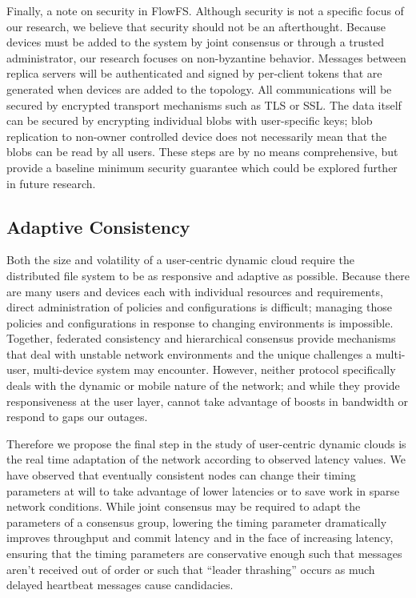 \documentclass{article}
\begin{document}
Finally, a note on security in FlowFS. Although security is not a specific focus of our research, we believe that security should not be an afterthought. Because devices must be added to the system by joint consensus or through a trusted administrator, our research focuses on non-byzantine behavior. Messages between replica servers will be authenticated and signed by per-client tokens that are generated when devices are added to the topology. All communications will be secured by encrypted transport mechanisms such as TLS or SSL. The data itself can be secured by encrypting individual blobs with user-specific keys; blob replication to non-owner controlled device does not necessarily mean that the blobs can be read by all users. These steps are by no means comprehensive, but provide a baseline minimum security guarantee which could be explored further in future research.

\subsection{Adaptive Consistency}
\label{sec:adaptive}

Both the size and volatility of a user-centric dynamic cloud require the distributed file system to be as responsive and adaptive as possible. Because there are many users and devices each with individual resources and requirements, direct administration of policies and configurations is difficult; managing those policies and configurations in response to changing environments is impossible. Together, federated consistency and hierarchical consensus provide mechanisms that deal with unstable network environments and the unique challenges a multi-user, multi-device system may encounter. However, neither protocol specifically deals with the dynamic or mobile nature of the network; and while they provide responsiveness at the user layer, cannot take advantage of boosts in bandwidth or respond to gaps our outages.

Therefore we propose the final step in the study of user-centric dynamic clouds is the real time adaptation of the network according to observed latency values. We have observed that eventually consistent nodes can change their timing parameters at will to take advantage of lower latencies or to save work in sparse network conditions. While joint consensus may be required to adapt the parameters of a consensus group, lowering the timing parameter dramatically improves throughput and commit latency and in the face of increasing latency, ensuring that the timing parameters are conservative enough such that messages aren't received out of order or such that ``leader thrashing'' occurs as much delayed heartbeat messages cause candidacies.
\end{document}
